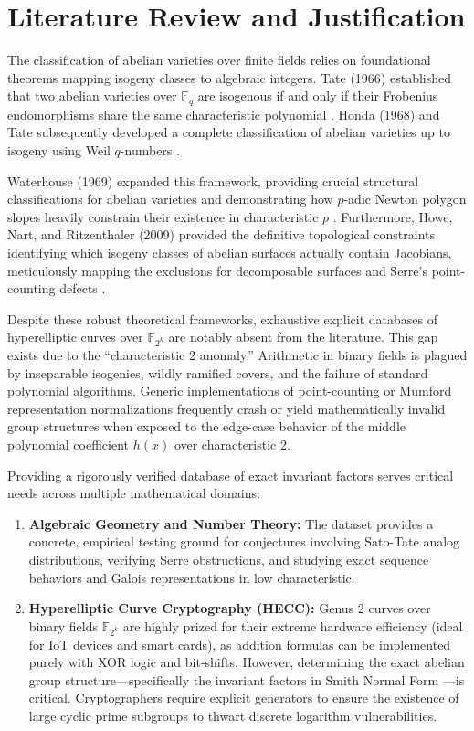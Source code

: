 \documentclass[12pt]{article}
\begin{document}
\section{Literature Review and Justification}
The classification of abelian varieties over finite fields relies on foundational theorems mapping isogeny classes to algebraic integers. Tate (1966) established that two abelian varieties over $\mathbb{F}_q$ are isogenous if and only if their Frobenius endomorphisms share the same characteristic polynomial \cite{Tate1966}. Honda (1968) and Tate subsequently developed a complete classification of abelian varieties up to isogeny using Weil $q$-numbers \cite{Honda1968}. 

Waterhouse (1969) expanded this framework, providing crucial structural classifications for abelian varieties and demonstrating how $p$-adic Newton polygon slopes heavily constrain their existence in characteristic $p$ \cite{Waterhouse1969}. Furthermore, Howe, Nart, and Ritzenthaler (2009) provided the definitive topological constraints identifying which isogeny classes of abelian surfaces actually contain Jacobians, meticulously mapping the exclusions for decomposable surfaces and Serre's point-counting defects \cite{Howe2009}. 

Despite these robust theoretical frameworks, exhaustive explicit databases of hyperelliptic curves over $\mathbb{F}_{2^k}$ are notably absent from the literature. This gap exists due to the ``characteristic 2 anomaly.'' Arithmetic in binary fields is plagued by inseparable isogenies, wildly ramified covers, and the failure of standard polynomial algorithms. Generic implementations of point-counting or Mumford representation normalizations frequently crash or yield mathematically invalid group structures when exposed to the edge-case behavior of the middle polynomial coefficient $h(x)$ over characteristic 2. 

Providing a rigorously verified database of exact invariant factors serves critical needs across multiple mathematical domains:
\begin{enumerate}
    \item \textbf{Algebraic Geometry and Number Theory:} The dataset provides a concrete, empirical testing ground for conjectures involving Sato-Tate analog distributions, verifying Serre obstructions, and studying exact sequence behaviors and Galois representations in low characteristic.
    \item \textbf{Hyperelliptic Curve Cryptography (HECC):} Genus 2 curves over binary fields $\mathbb{F}_{2^k}$ are highly prized for their extreme hardware efficiency (ideal for IoT devices and smart cards), as addition formulas can be implemented purely with XOR logic and bit-shifts. However, determining the exact abelian group structure---specifically the invariant factors in Smith Normal Form \cite{Smith1861}---is critical. Cryptographers require explicit generators to ensure the existence of large cyclic prime subgroups to thwart discrete logarithm vulnerabilities.
\end{enumerate}
\end{document}

